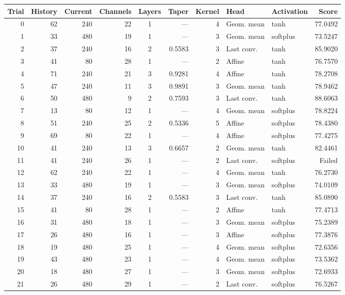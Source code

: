 \begin{tabular}{@{}rrrrcrrllr@{}}
\toprule
Trial & History & Current & Channels & Layers & Taper & Kernel & Head & Activation & Score \\
\midrule
0 & 62 & 240 & 22 & 1 & --- & 4 & Geom. mean & tanh & 77.0492 \\
1 & 33 & 480 & 19 & 1 & --- & 3 & Geom. mean & softplus & 73.5247 \\
2 & 37 & 240 & 16 & 2 & 0.5583 & 3 & Last conv. & tanh & 85.9020 \\
3 & 41 & 80 & 28 & 1 & --- & 2 & Affine & tanh & 76.7570 \\
4 & 71 & 240 & 21 & 3 & 0.9281 & 4 & Affine & tanh & 78.2708 \\
5 & 47 & 240 & 11 & 3 & 0.9891 & 3 & Geom. mean & tanh & 78.9462 \\
6 & 50 & 480 & 9 & 2 & 0.7593 & 3 & Last conv. & tanh & 88.6063 \\
7 & 13 & 80 & 12 & 1 & --- & 4 & Geom. mean & softplus & 78.8224 \\
8 & 51 & 240 & 25 & 2 & 0.5336 & 5 & Affine & softplus & 78.4380 \\
9 & 69 & 80 & 22 & 1 & --- & 4 & Affine & softplus & 77.4275 \\
10 & 41 & 240 & 13 & 3 & 0.6657 & 2 & Geom. mean & tanh & 82.4461 \\
11 & 41 & 240 & 26 & 1 & --- & 2 & Last conv. & softplus & Failed \\
12 & 62 & 240 & 22 & 1 & --- & 4 & Geom. mean & tanh & 76.2730 \\
13 & 33 & 480 & 19 & 1 & --- & 3 & Geom. mean & softplus & 74.0109 \\
14 & 37 & 240 & 16 & 2 & 0.5583 & 3 & Last conv. & tanh & 85.0890 \\
15 & 41 & 80 & 28 & 1 & --- & 2 & Affine & tanh & 77.4713 \\
16 & 31 & 480 & 18 & 1 & --- & 3 & Geom. mean & softplus & 75.2389 \\
17 & 26 & 480 & 16 & 1 & --- & 3 & Affine & softplus & 77.3876 \\
18 & 19 & 480 & 25 & 1 & --- & 4 & Geom. mean & softplus & 72.6356 \\
19 & 43 & 480 & 23 & 1 & --- & 4 & Geom. mean & softplus & 73.5362 \\
20 & 18 & 480 & 27 & 1 & --- & 3 & Geom. mean & softplus & 72.6933 \\
21 & 26 & 480 & 29 & 1 & --- & 2 & Last conv. & softplus & 76.5267 \\

\end{tabular}

